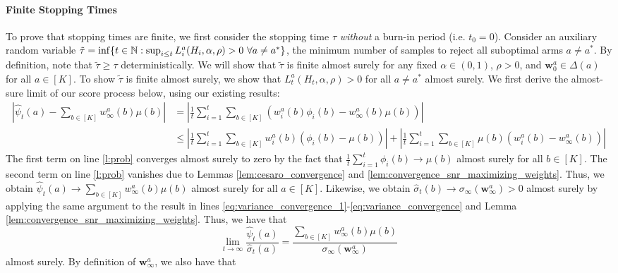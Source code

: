 \documentclass{article}
\begin{document}
\begin{appendices}
\paragraph{Finite Stopping Times}
To prove that stopping times are finite, we first consider the stopping time $\tau$ \textit{without} a burn-in period (i.e. $t_0 = 0$). Consider an auxiliary random variable $\tilde\tau = \inf\{t \in \mathbb{N}: \sup_{i \leq t} L_i^a(H_i, \alpha, \rho) > 0 \ \forall a \neq a^*\}$, the minimum number of samples to reject all suboptimal arms $a \neq a^*$. By definition, note that $\tilde{\tau} \geq \tau$ deterministically. We will show that $\tilde{\tau}$ is finite almost surely for any fixed $\alpha \in (0,1)$, $\rho > 0$, and $\bm{w}_0^a \in \Delta(a)$ for all $a \in [K]$. To show $\tilde\tau$ is finite almost surely, we show that $L_t^a(H_t, \alpha, \rho) > 0$ for all $a \neq a^*$ almost surely. We first derive the almost-sure limit of our score process below, using our existing results:
\begin{align}
    \left|\hat{\psi}_t(a) - \sum_{b \in [K]} w_\infty^a(b) \mu(b)\right| &= \left|\frac{1}{t}\sum_{i=1}^t\sum_{b \in [K]} \left(w_i^a(b) \phi_i(b) - w_\infty^a(b)\mu(b)\right)\right| \\
    & \leq \left|\frac{1}{t}\sum_{i=1}^t\sum_{b \in [K]} w_i^a(b) (\phi_i(b) -  \mu(b)) \right| +  \left|\frac{1}{t}\sum_{i=1}^t\sum_{b \in [K]}\mu(b)(w_i^a(b) - w_\infty^a(b))\right|\label{l:prob}
\end{align}
The first term on line \eqref{l:prob} converges almost surely to zero by the fact that $\frac{1}{t}\sum_{i=1}^t \phi_i(b) \rightarrow \mu(b)$ almost surely for all $b \in [K]$. The second term on line \eqref{l:prob} vanishes due to Lemmas \ref{lem:cesaro_convergence} and \ref{lem:convergence_snr_maximizing_weights}. Thus, we obtain $\hat\psi_t(a) \rightarrow \sum_{b \in [K]} w_\infty^a(b)\mu(b)$ almost surely for all $a \in [K]$. Likewise, we obtain $\hat\sigma_t(b) \rightarrow \sigma_\infty(\bm{w}_\infty^a) > 0$ almost surely by applying the same argument to the result in lines \eqref{eq:variance_convergence_1}-\eqref{eq:variance_convergence} and Lemma \ref{lem:convergence_snr_maximizing_weights}. Thus, we have that
\begin{equation}
    \lim_{t \rightarrow \infty}\frac{\hat\psi_t(a)}{\hat\sigma_t(a)} = \frac{\sum_{b \in [K]}w_\infty^a(b)\mu(b)}{\sigma_\infty(\bm{w}_\infty^a)} \label{eq:key_identity}
\end{equation}
almost surely. By definition of $\bm{w}_\infty^a$, we also have that 
\begin{equation}

\end{equation}
\end{appendices}
\end{document}
